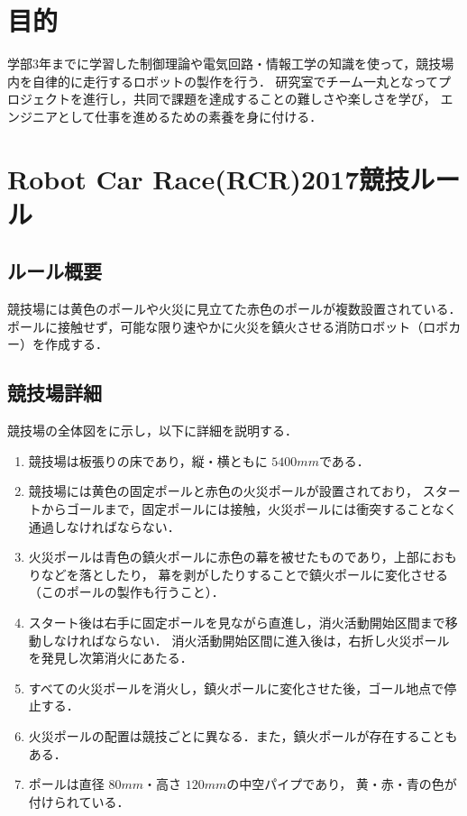 \documentclass[11pt,a4]{jsarticle}
\begin{document}
  

\newpage
\section{目的} 
  学部3年までに学習した制御理論や電気回路・情報工学の知識を使って，競技場内を自律的に走行するロボットの製作を行う．
  研究室でチーム一丸となってプロジェクトを進行し，共同で課題を達成することの難しさや楽しさを学び，
  エンジニアとして仕事を進めるための素養を身に付ける．

\section{Robot Car Race(RCR)2017競技ルール}

  \subsection{ルール概要}
    競技場には黄色のポールや火災に見立てた赤色のポールが複数設置されている．
    ポールに接触せず，可能な限り速やかに火災を鎮火させる消防ロボット（ロボカー）を作成する．

  \subsection{競技場詳細}
    競技場の全体図をに示し，以下に詳細を説明する．

    \begin{enumerate}
      \item 競技場は板張りの床であり，縦・横ともに $5400\unit{mm}$である．
      \item 競技場には黄色の固定ポールと赤色の火災ポールが設置されており，
            スタートからゴールまで，固定ポールには接触，火災ポールには衝突することなく通過しなければならない．
      \item 火災ポールは青色の鎮火ポールに赤色の幕を被せたものであり，上部におもりなどを落としたり，
            幕を剥がしたりすることで鎮火ポールに変化させる（このポールの製作も行うこと）．
      \item スタート後は右手に固定ポールを見ながら直進し，消火活動開始区間まで移動しなければならない．
            消火活動開始区間に進入後は，右折し火災ポールを発見し次第消火にあたる．
      \item すべての火災ポールを消火し，鎮火ポールに変化させた後，ゴール地点で停止する．
      \item 火災ポールの配置は競技ごとに異なる．また，鎮火ポールが存在することもある．
      \item ポールは直径 $80\unit{mm}$・高さ $120\unit{mm}$の中空パイプであり，
            黄・赤・青の色が付けられている．
    \end{enumerate}
\end{document}
